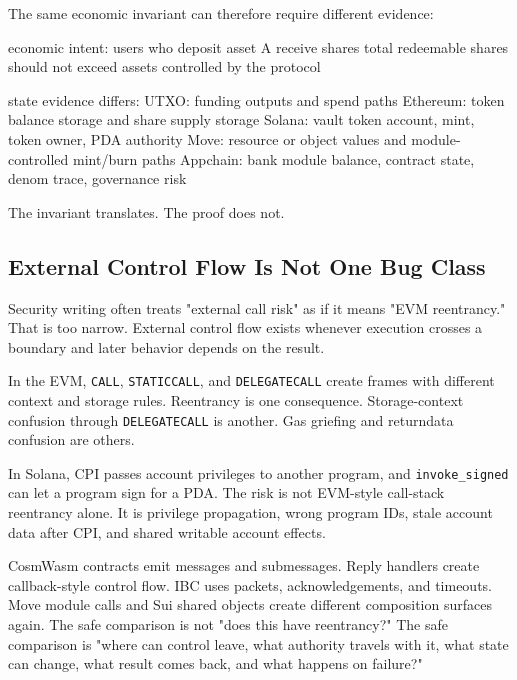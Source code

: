 The same economic invariant can therefore require different evidence:

\begin{codeblock}
economic intent:
    users who deposit asset A receive shares
    total redeemable shares should not exceed assets controlled by the protocol

state evidence differs:
    UTXO: funding outputs and spend paths
    Ethereum: token balance storage and share supply storage
    Solana: vault token account, mint, token owner, PDA authority
    Move: resource or object values and module-controlled mint/burn paths
    Appchain: bank module balance, contract state, denom trace, governance risk
\end{codeblock}

The invariant translates. The proof does not.

\subsection{External Control Flow Is Not One Bug Class}

Security writing often treats "external call risk" as if it means "EVM reentrancy." That is too narrow. External control flow exists whenever execution crosses a boundary and later behavior depends on the result.

In the EVM, \texttt{CALL}, \texttt{STATICCALL}, and \texttt{DELEGATECALL} create frames with different context and storage rules. Reentrancy is one consequence. Storage-context confusion through \texttt{DELEGATECALL} is another. Gas griefing and returndata confusion are others.

In Solana, CPI passes account privileges to another program, and \texttt{invoke\_signed} can let a program sign for a PDA. The risk is not EVM-style call-stack reentrancy alone. It is privilege propagation, wrong program IDs, stale account data after CPI, and shared writable account effects.

CosmWasm contracts emit messages and submessages. Reply handlers create callback-style control flow. IBC uses packets, acknowledgements, and timeouts. Move module calls and Sui shared objects create different composition surfaces again. The safe comparison is not "does this have reentrancy?" The safe comparison is "where can control leave, what authority travels with it, what state can change, what result comes back, and what happens on failure?"

